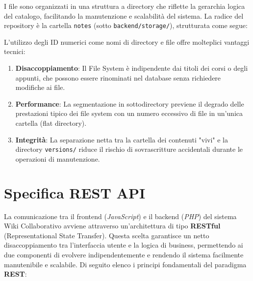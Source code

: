 \noindent I file sono organizzati in una struttura a directory che riflette la gerarchia logica del catalogo, facilitando la manutenzione e scalabilità del sistema. La radice del repository è la cartella \texttt{notes} (sotto \texttt{backend/storage/}), strutturata come segue:

\begin{center}
    \begin{minipage}{0.85\textwidth}
    \end{minipage}
\end{center}

\noindent L'utilizzo degli ID numerici come nomi di directory e file offre molteplici vantaggi tecnici:
\begin{enumerate}
    \item \textbf{Disaccoppiamento}: Il File System è indipendente dai titoli dei corsi o degli appunti, che possono essere rinominati nel database senza richiedere modifiche ai file.
    \item \textbf{Performance}: La segmentazione in sottodirectory previene il degrado delle prestazioni tipico dei file system con un numero eccessivo di file in un'unica cartella (flat directory).
    \item \textbf{Integrità}: La separazione netta tra la cartella dei contenuti "vivi" e la directory \texttt{versions/} riduce il rischio di sovrascritture accidentali durante le operazioni di manutenzione.
\end{enumerate}

\section{Specifica REST API}

\noindent La comunicazione tra il frontend (\textit{JavaScript}) e il backend (\textit{PHP}) del sistema Wiki Collaborativo avviene attraverso un’architettura di tipo \textbf{RESTful} (Representational State Transfer). Questa scelta garantisce un netto disaccoppiamento tra l'interfaccia utente e la logica di business, permettendo ai due componenti di evolvere indipendentemente e rendendo il sistema facilmente manutenibile e scalabile. Di seguito elenco i principi fondamentali del paradigma \textbf{REST}:

